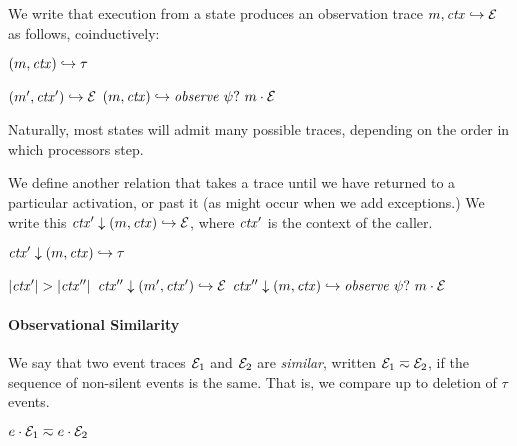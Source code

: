 \documentclass[10pt,conference]{ieeetran}%
\theoremstyle{definition}
\begin{document}
We write that execution from a state produces an observation trace \(m,\mathit{ctx} \hookrightarrow \mathcal{E}\)
as follows, coinductively:

         {\((m,\mathit{ctx}) \hookrightarrow \tau\)}

            {\((m',\mathit{ctx}') \hookrightarrow \mathcal{E}\)}
            {\((m,\mathit{ctx}) \hookrightarrow \mathit{observe} ~ \psi? ~ m \cdot \mathcal{E}\)}

Naturally, most states will admit many possible traces, depending on the order in which
processors step.

We define another relation that takes a trace until we have returned to a particular
activation, or past it (as might occur when we add exceptions.)
We write this \(\mathit{ctx}' \downarrow (m,\mathit{ctx}) \hookrightarrow \mathcal{E}\), where \(\mathit{ctx}'\)
is the context of the caller.

         {\(\mathit{ctx}' \downarrow (m,\mathit{ctx}) \hookrightarrow \tau\)}

                  {\(|\mathit{ctx}'| > |\mathit{ctx}''|\)}
                  {\(\mathit{ctx}'' \downarrow (m',\mathit{ctx}') \hookrightarrow \mathcal{E}\)}
                  {\(\mathit{ctx}'' \downarrow (m,\mathit{ctx}) \hookrightarrow \mathit{observe} ~ \psi? ~ m \cdot \mathcal{E}\)}

\paragraph*{Observational Similarity}

We say that two event traces $\mathcal{E}_1$ and $\mathcal{E}_2$ are {\em similar},
written \(\mathcal{E}_1 \eqsim \mathcal{E}_2\), if the sequence of non-silent events
is the same. That is, we compare up to deletion of \(\tau\) events.

\begin{minipage}{.4\columnwidth}
  \judgment{}{\(\obsT \eqsim \obsT\)}
\end{minipage}
\begin{minipage}{.4\columnwidth}
           {\(e \cdot \mathcal{E}_1 \eqsim e \cdot \mathcal{E}_2\)}
\end{minipage}
\end{document}
